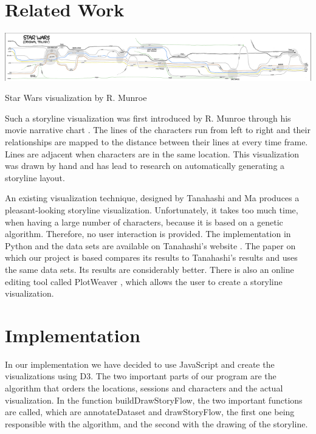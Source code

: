 \documentclass{report}
\begin{document}
\chapter{Related Work}
\centerline{\includegraphics{movie_narrative_chart_star_wars_resized}}
\par
\begin{center}
Star Wars visualization by R. Munroe
\end{center}
\par
Such a storyline visualization was first introduced by R. Munroe through his movie narrative chart \cite{xkcd}. The lines of the characters run from left to right and their relationships are mapped to the distance between their lines at every time frame. Lines are adjacent when characters are in the same location. This visualization was drawn by hand and has lead to research on automatically generating a storyline layout.
\par
An existing visualization technique, designed by Tanahashi and Ma \cite{tanahashi} produces a pleasant-looking storyline visualization. Unfortunately, it takes too much time, when having a large number of characters, because it is based on a genetic algorithm. Therefore, no user interaction is provided. The implementation in Python and the data sets are available on Tanahashi's website \cite{website:tanahashi}. The paper on which our project is based compares its results to Tanahashi's results and uses the same data sets. Its results are considerably better. There is also an online editing tool called PlotWeaver \cite{plotweaver}, which allows the user to create a storyline visualization.

\chapter{Implementation}
\par
In our implementation we have decided to use JavaScript and create the visualizations using D3. The two important parts of our program are the algorithm that orders the locations, sessions and characters and the actual visualization. In the function buildDrawStoryFlow, the two important functions are called, which are annotateDataset and drawStoryFlow, the first one being responsible with the algorithm, and the second with the drawing of the storyline.
\end{document}
